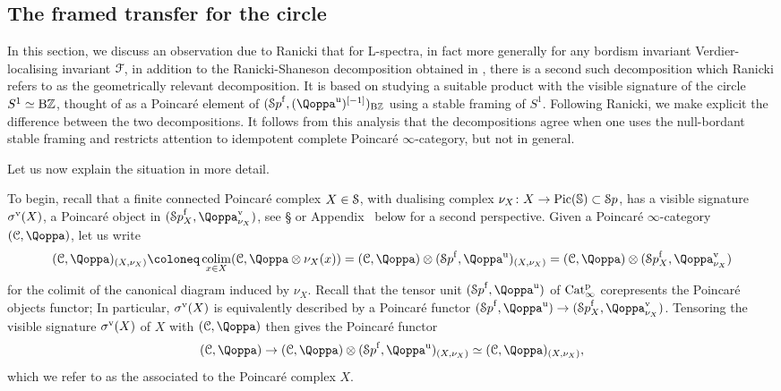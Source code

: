 \subsection{The framed transfer for the circle}
\label{subsection:splittings}%

In this section, we discuss an observation due to Ranicki that for L-spectra, in fact more generally for any bordism invariant Verdier-localising invariant $\mathcal{F}$, in addition to the Ranicki-Shaneson decomposition obtained in , there is a second such decomposition which Ranicki refers to as the geometrically relevant decomposition. It is based on studying a suitable product with the visible signature of the circle $S^1 \simeq \mathrm{B}\mathbb{Z}$, thought of as a Poincar\'e element of $(\Spa^\free,(\QF^\uni)\qshift{-1})_{\B\ZZ}$ using a stable framing of $S^1$. Following Ranicki, we make explicit the difference between the two decompositions. It follows from this analysis that the decompositions agree when one uses the null-bordant stable framing and restricts attention to idempotent complete Poincar\'e $\infty$-category, but not in general.

Let us now explain the situation in more detail.
\begin{construction}
\label{const:transfer}%
To begin, recall that a finite connected Poincar\'e complex $X \in \mathcal S$, with dualising complex $\nu_X\colon X\to \operatorname{Pic}(\mathbb{S}) \subset {\mathcal Sp}$, has a visible signature $\sigma^{\mathrm{v}}(X)$, a Poincaré object in $(\Spa_X^\free,\QF^\vis_{\nu_X})$, see \S{} or Appendix~ below for a second perspective.
Given a Poincar\'e $\infty$-category $(\C,\QF)$, let us write 
\[
(\C, \QF)_{(X, \nu_X)} \coloneq \colim_{x\in X} (\C, \QF\otimes \nu_X(x)) = (\C,\QF) \otimes (\Spaf, \QF^\uni)_{(X, \nu_X)} = (\C,\QF) \otimes (\Spa_X^\free,\QF^\vis_{\nu_X})
\]
for the colimit of the canonical diagram induced by $\nu_X$. Recall that the tensor unit $(\Spaf,\QF^\uni)$ of $\mathrm{Cat}^{\mathrm p}_\infty$ corepresents the Poincar\'e objects functor; In particular, $\sigma^{\mathrm{v}}(X)$ is equivalently described by a Poincar\'e functor $(\Spaf,\QF^\uni) \to (\Spa_X^\free,\QF^\vis_{\nu_X})$. 
Tensoring the visible signature $\sigma^{\mathrm{v}}(X)$ of $X$ with 
$(\C,\QF)$ then gives the Poincar\'e functor 
\[
(\C, \QF) \to (\C, \QF)\otimes (\Spaf, \QF^\uni)_{(X, \nu_X)} \simeq (\C, \QF)_{(X, \nu_X)},
\]
which we refer to as the  associated to the Poincar\'e complex $X$. 
\end{construction}

